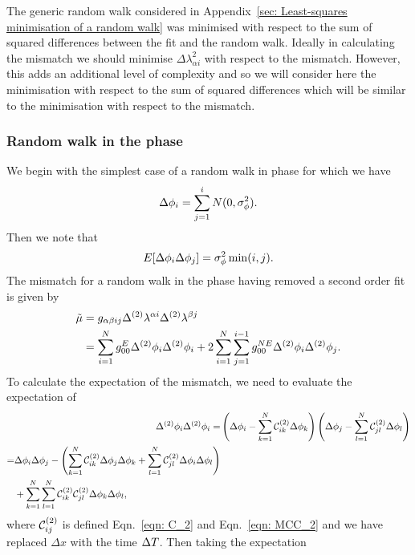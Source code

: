 The generic random walk considered in Appendix~\ref{sec: Least-squares
minimisation of a random walk} was minimised with respect to the sum of squared
differences between the fit and the random walk. Ideally in calculating the
mismatch we should minimise $\Delta\lambda_{\alpha i}^{2}$ with respect to the
mismatch. However, this adds an additional level of complexity and so we will
consider here the minimisation with respect to the sum of squared differences
which will be similar to the minimisation with respect to the mismatch.

\subsubsection{Random walk in the phase}
We begin with the simplest case of a random walk in phase for which we have
\begin{equation}
\Delta\phi_{i} = \sum_{j=1}^{i}N(0, \sigma_{\phi}^{2}).
\end{equation}
Then we note that
\begin{equation}
E[\Delta\phi_{i} \Delta\phi_{j}] = \sigma_{\phi}^{2} \min(i, j).
\end{equation}
The mismatch for a random walk in the phase having removed a second order
fit is given by
\begin{align}
\tilde{\mu} & = g_{\alpha \beta i j} \Delta^{(2)}\lambda^{\alpha i}\Delta^{(2)}\lambda^{\beta j} \\
& = \sum_{i=1}^{N}g_{00}^{E} \Delta^{(2)}\phi_{i}\Delta^{(2)}\phi_{i}
+ 2 \sum_{i=1}^{N}\sum_{j=1}^{i-1}g_{00}^{NE}\Delta^{(2)}\phi_{i}\Delta^{(2)}\phi_{j}.
\label{eqn: 4202540871}
\end{align}
To calculate the expectation of the mismatch, we need to evaluate the
expectation of
\begin{align}
\Delta^{(2)}\phi_{i}\Delta^{(2)}\phi_{i} = & \left(\Delta\phi_{i}
- \sum_{k=1}^{N}\mathcal{C}^{(2)}_{ik}\Delta\phi_{k}\right)
 \left(\Delta\phi_{j} - \sum_{l=1}^{N}\mathcal{C}^{(2)}_{jl}\Delta\phi_{l}\right) \\
\begin{split}
= & \Delta\phi_{i}\Delta\phi_{j} -
\left(\sum_{k=1}^{N}\mathcal{C}^{(2)}_{ik} \Delta\phi_{j}\Delta\phi_{k}
+ \sum_{l=1}^{N}\mathcal{C}^{(2)}_{jl}\Delta\phi_{i}\Delta\phi_{l}\right) \\
& +
\sum_{k=1}^{N}\sum_{l=1}^{N}\mathcal{C}^{(2)}_{ik}\mathcal{C}^{(2)}_{jl} \Delta\phi_{k}\Delta\phi_{l},
\end{split}
\end{align}
where $\mathcal{C}^{(2)}_{ij}$ is defined Eqn.~\ref{eqn: C_2} and Eqn.~\ref{eqn:  MCC_2}
and we have replaced $\Delta x$ with the time $\Delta T$. Then taking the expectation
